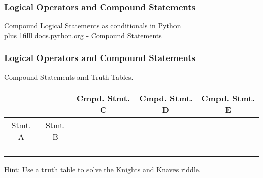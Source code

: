 \documentclass[fleqn]{beamer} %
\newcommand{\sectiontitleV}{Logical Operators and Compound Statements}
\newcommand{\btVFill}{\vskip0pt plus 1filll}
\begin{document}
	\begin{frame}[label=sectionV,containsverbatim] \small
	\frametitle{\sectiontitleV}    
	
	Compound Logical Statements as conditionals in Python  \vspace{5mm}\\

	\btVFill
	\href{https://docs.python.org/3/reference/compound_stmts.html#}{docs.python.org - Compound Statements}
	\end{frame}


	\begin{frame}[label=sectionV,containsverbatim] \small
	\frametitle{\sectiontitleV}    
	
	Compound Statements and Truth Tables.  \vspace{5mm}\\
	
	\renewcommand*{\arraystretch}{1.5}
	\begin{tabular}{|c|c|c|c|c|} \hline
		---&---& Cmpd. Stmt. C& Cmpd. Stmt. D& Cmpd. Stmt. E \\ \hline
		Stmt. A&Stmt. B& & & \\ \hline
		& & & & \\ \hline
		& & & & \\ \hline
		& & & & \\ \hline
		& & & & \\ \hline 
	
	\end{tabular}

	\vspace*{3mm}
	Hint: Use a truth table to solve the Knights and Knaves riddle.

	\end{frame}
\end{document}
